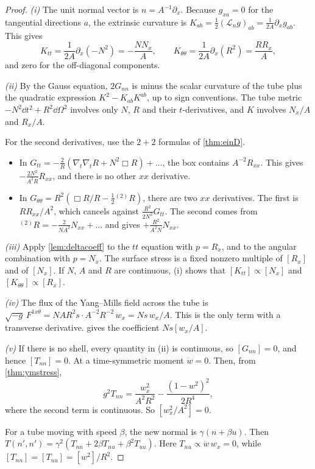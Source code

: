 \begin{proof}
\emph{(i)} The unit normal vector is $n=A^{-1}\partial_x$. Because $g_{xa}=0$ for the tangential directions $a$, the extrinsic curvature is $K_{ab}=\frac12(\mathcal L_ng)_{ab}=\frac1{2A}\partial_xg_{ab}$. This gives
\[
K_{tt}=\frac1{2A}\partial_x(-N^2)=-\frac{NN_x}A,\qquad K_{\theta\theta}=\frac1{2A}\partial_x(R^2)=\frac{RR_x}A ,
\]
and zero for the off-diagonal components.

\emph{(ii)} By the Gauss equation, $2G_{nn}$ is minus the scalar curvature of the tube plus the quadratic expression $K^2-K_{ab}K^{ab}$, up to sign conventions. The tube metric $-N^2\dd t^2+R^2\dd\Omega^2$ involves only $N$, $R$ and their $t$-derivatives, and $K$ involves $N_x/A$ and $R_x/A$.

For the second derivatives, use the $2+2$ formulas of \cref{thm:einD}.
\begin{itemize}
\item In $G_{tt}=-\frac2R(\nabla_t\nabla_tR+N^2\Box R)+\dots$, the box contains $A^{-2}R_{xx}$. This gives $-\frac{2N^2}{A^2R}R_{xx}$, and there is no other $xx$ derivative.
\item In $G_{\theta\theta}=R^2(\Box R/R-\frac12{}^{(2)}\!R)$, there are two $xx$ derivatives. The first is $RR_{xx}/A^2$, which cancels against $\frac{R^2}{2N^2}G_{tt}$. The second comes from ${}^{(2)}\!R=-\frac2{NA^2}N_{xx}+\dots$ and gives $+\frac{R^2}{A^2N}N_{xx}$.
\end{itemize}

\emph{(iii)} Apply \cref{lem:deltacoeff} to the $tt$ equation with $p=R_x$, and to the angular combination with $p=N_x$. The surface stress is a fixed nonzero multiple of $[R_x]$ and of $[N_x]$. If $N$, $A$ and $R$ are continuous, (i) shows that $[K_{tt}]\propto[N_x]$ and $[K_{\theta\theta}]\propto[R_x]$.

\emph{(iv)} The flux of the Yang--Mills field across the tube is $\sqrt{-g}\,F^{1x\theta}=NAR^2s\cdot A^{-2}R^{-2}\,w_x=Ns\,w_x/A$. This is the only term with a transverse derivative.  gives the coefficient $Ns[w_x/A]$.

\emph{(v)} If there is no shell, every quantity in (ii) is continuous, so $[G_{nn}]=0$, and hence $[T_{nn}]=0$. At a time-symmetric moment $\dot w=0$. Then, from \cref{thm:ymstress},
\[
g^2T_{nn}=\frac{w_x^2}{A^2R^2}-\frac{(1-w^2)^2}{2R^4} ,
\]
where the second term is continuous. So $[w_x^2/A^2]=0$.

For a tube moving with speed $\beta$, the new normal is $\gamma(n+\beta u)$. Then $T(n',n')=\gamma^2(T_{nn}+2\beta T_{nu}+\beta^2T_{uu})$. Here $T_{nu}\propto\dot w\,w_x=0$, while $[T_{nn}]=[T_{uu}]=[w^2]/R^2$.
\end{proof}


